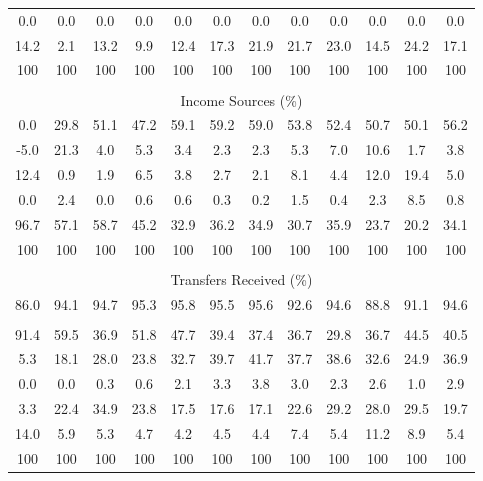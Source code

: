 \begin{tabular}{c c c| c c c c c| c c c| c}
0.0 & 0.0 & 0.0 & 0.0 & 0.0 & 0.0 & 0.0 & 0.0 & 0.0 & 0.0 & 0.0 & 0.0 \\
14.2 & 2.1 & 13.2 & 9.9 & 12.4 & 17.3 & 21.9 & 21.7 & 23.0 & 14.5 & 24.2 & 17.1 \\
\midrule
100 & 100 & 100 & 100 & 100 & 100 & 100 & 100 & 100 & 100 & 100 & 100 \\
\midrule \\
\multicolumn{12}{c}{Income Sources (\%)}  \\
\midrule
0.0 & 29.8 & 51.1 & 47.2 & 59.1 & 59.2 & 59.0 & 53.8 & 52.4 & 50.7 & 50.1 & 56.2 \\
-5.0 & 21.3 & 4.0 & 5.3 & 3.4 & 2.3 & 2.3 & 5.3 & 7.0 & 10.6 & 1.7 & 3.8 \\
12.4 & 0.9 & 1.9 & 6.5 & 3.8 & 2.7 & 2.1 & 8.1 & 4.4 & 12.0 & 19.4 & 5.0 \\
0.0 & 2.4 & 0.0 & 0.6 & 0.6 & 0.3 & 0.2 & 1.5 & 0.4 & 2.3 & 8.5 & 0.8 \\
96.7 & 57.1 & 58.7 & 45.2 & 32.9 & 36.2 & 34.9 & 30.7 & 35.9 & 23.7 & 20.2 & 34.1 \\
\midrule
100 & 100 & 100 & 100 & 100 & 100 & 100 & 100 & 100 & 100 & 100 & 100 \\
\midrule \\
\multicolumn{12}{c}{Transfers Received (\%)}  \\
\midrule
86.0 & 94.1 & 94.7 & 95.3 & 95.8 & 95.5 & 95.6 & 92.6 & 94.6 & 88.8 & 91.1 & 94.6 \\
 & & & & & & & & & & &  \\
91.4 & 59.5 & 36.9 & 51.8 & 47.7 & 39.4 & 37.4 & 36.7 & 29.8 & 36.7 & 44.5 & 40.5 \\
5.3 & 18.1 & 28.0 & 23.8 & 32.7 & 39.7 & 41.7 & 37.7 & 38.6 & 32.6 & 24.9 & 36.9 \\
0.0 & 0.0 & 0.3 & 0.6 & 2.1 & 3.3 & 3.8 & 3.0 & 2.3 & 2.6 & 1.0 & 2.9 \\
3.3 & 22.4 & 34.9 & 23.8 & 17.5 & 17.6 & 17.1 & 22.6 & 29.2 & 28.0 & 29.5 & 19.7 \\
14.0 & 5.9 & 5.3 & 4.7 & 4.2 & 4.5 & 4.4 & 7.4 & 5.4 & 11.2 & 8.9 & 5.4 \\
\midrule
100 & 100 & 100 & 100 & 100 & 100 & 100 & 100 & 100 & 100 & 100 & 100 \\
\bottomrule
\end{tabular}